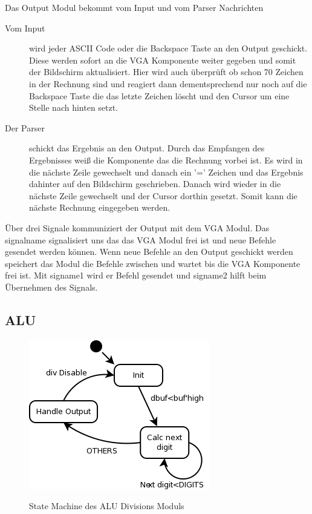 Das Output Modul bekommt vom Input und vom Parser Nachrichten\\
\begin{description}
 \item[Vom Input] wird jeder ASCII Code oder die Backspace Taste an den Output geschickt. Diese werden
sofort an die VGA Komponente weiter gegeben und somit der Bildschirm aktualisiert. Hier wird auch überprüft ob
schon 70 Zeichen in der Rechnung sind und reagiert dann dementsprechend nur noch auf die Backspace Taste die das letzte Zeichen
löscht und den Cursor um eine Stelle nach hinten setzt.\\
 \item[Der Parser] schickt das Ergebnis an den Output. Durch das Empfangen des Ergebnisses weiß die Komponente
das die Rechnung vorbei ist. Es wird in die nächste Zeile gewechselt und danach ein '=' Zeichen und das Ergebnis
dahinter auf den Bildschirm geschrieben. Danach wird wieder in die nächste Zeile gewechselt und der Cursor dorthin
gesetzt. Somit kann die nächste Rechnung eingegeben werden.
 \end{description}
Über drei Signale kommuniziert der Output mit dem VGA Modul. Das signalname signalisiert uns das das VGA Modul 
frei ist und neue Befehle gesendet werden können. Wenn neue Befehle an den Output geschickt werden speichert das
Modul die Befehle zwischen und wartet bis die VGA Komponente frei ist. Mit signame1 wird er Befehl
gesendet und signame2 hilft beim Übernehmen des Signals.


\subsection{ALU}

\begin{figure}[!ht]
 \caption{State Machine des ALU Divisions Moduls}
 \centering
 \includegraphics[scale=0.55]{pics/alu_div.png}
 \label{fig:Modules}
\end{figure}

